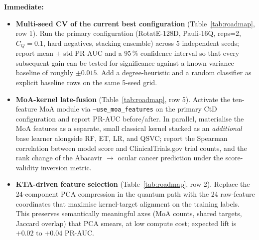 \documentclass[twocolumn,10pt]{article}
\begin{document}
\vspace{0.6em}
\noindent\textbf{Immediate:}
\begin{itemize}[leftmargin=*]
\item \textbf{Multi-seed CV of the current best configuration} (Table~\ref{tab:roadmap}, row 1). Run the primary configuration (RotatE-128D, Pauli-16Q, reps=2, $C_{Q}=0.1$, hard negatives, stacking ensemble) across 5 independent seeds; report mean $\pm$ std PR-AUC and a 95\,\% confidence interval so that every subsequent gain can be tested for significance against a known variance baseline of roughly $\pm 0.015$. Add a degree-heuristic and a random classifier as explicit baseline rows on the same 5-seed grid.
\item \textbf{MoA-kernel late-fusion} (Table~\ref{tab:roadmap}, row 5). Activate the ten-feature MoA module via \texttt{--use\_moa\_features} on the primary CtD configuration and report PR-AUC before/after. In parallel, materialise the MoA features as a separate, small classical kernel stacked as an \emph{additional} base learner alongside RF, ET, LR, and QSVC; report the Spearman correlation between model score and ClinicalTrials.gov trial counts, and the rank change of the Abacavir $\to$ ocular cancer prediction under the score-validity inversion metric.
\item \textbf{KTA-driven feature selection} (Table~\ref{tab:roadmap}, row 2). Replace the 24-component PCA compression in the quantum path with the 24 raw-feature coordinates that maximise kernel-target alignment on the training labels. This preserves semantically meaningful axes (MoA counts, shared targets, Jaccard overlap) that PCA smears, at low compute cost; expected lift is $+0.02$ to $+0.04$ PR-AUC.
\end{itemize}
\end{document}
